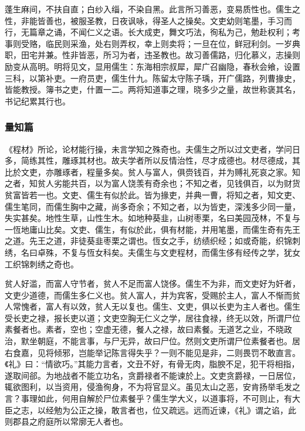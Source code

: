 \documentclass[]{article}
\begin{document}
蓬生麻间，不扶自直；白纱入缁，不染自黑。此言所习善恶，变易质性也。儒生之性，非能皆善也，被服圣教，日夜讽咏，得圣人之操矣。文吏幼则笔墨，手习而行，无篇章之诵，不闻仁义之语。长大成吏，舞文巧法，徇私为己，勉赴权利；考事则受赂，临民则采渔，处右则弄权，幸上则卖将；一旦在位，鲜冠利剑。一岁典职，田宅并兼。性非皆恶，所习为者，违圣教也。故习善儒路，归化慕义，志操则励变从高明。明将见文，显用儒生：东海相宗叔犀，犀广召幽隐，春秋会飨，设置三科，以第补吏。一府员吏，儒生什九。陈留太守陈子瑀，开广儒路，列曹掾史，皆能教授。簿书之吏，什置一二。两将知道事之理，晓多少之量，故世称褒其名，书记纪累其行也。

\hypertarget{header-n536}{%
\subsubsection{量知篇}\label{header-n536}}

《程材》所论，论材能行操，未言学知之殊奇也。夫儒生之所以过文吏者，学问日多，简练其性，雕琢其材也。故夫学者所以反情治性，尽才成德也。材尽德成，其比於文吏，亦雕琢者，程量多矣。贫人与富人，俱赍钱百，并为赙礼死哀之家。知之者，知贫人劣能共百，以为富人饶羡有奇余也；不知之者，见钱俱百，以为财货贫富皆若一也。文吏、儒生有似於此。皆为掾吏，并典一曹，将知之者，知文吏、儒生笔同，而儒生胸中之藏，尚多奇余；不知之者，以为皆吏，深浅多少同一量，失实甚矣。地性生草，山性生木。如地种葵韭，山树枣栗，名曰美园茂林，不复与一恆地庸山比矣。文吏、儒生，有似於此，俱有材能，并用笔墨，而儒生奇有先王之道。先王之道，非徒葵韭枣栗之谓也。恆女之手，纺绩织经；如或奇能，织锦刺绣，名曰卓殊，不复与恆女科矣。夫儒生与文吏程材，而儒生侈有经传之学，犹女工织锦刺绣之奇也。

贫人好滥，而富人守节者，贫人不足而富人饶侈。儒生不为非，而文吏好为奸者，文吏少道德，而儒生多仁义也。贫人富人，并为宾客，受赐於主人，富人不惭而贫人常愧者，富人有以效，贫人无以复也。儒生、文吏，俱以长吏为主人者也。儒生受长吏之禄，报长吏以道；文吏空胸无仁义之学，居往食禄，终无以效，所谓尸位素餐者也。素者，空也；空虚无德，餐人之禄，故曰素餐。无道艺之业，不晓政治，默坐朝庭，不能言事，与尸无异，故曰尸位。然则文吏所谓尸位素餐者也。居右食嘉，见将倾邪，岂能举记陈言得失乎？一则不能见是非，二则畏罚不敢直言。《礼》曰：``情欲巧。''其能力言者，文丑不好，有骨无肉，脂腴不足，犯干将相指，遂取间郤。为地战者不能立功名，贪爵禄者不能谏於上。文吏贪爵禄，一日居位，辄欲图利，以当资用，侵渔徇身，不为将官显义。虽见太山之恶，安肯扬举毛发之言？事理如此，何用自解於尸位素餐乎？儒生学大义，以道事将，不可则止，有大臣之志，以经勉为公正之操，敢言者也，位又疏远。远而近谏，《礼》谓之谄，此则郡县之府庭所以常廓无人者也。
\end{document}
